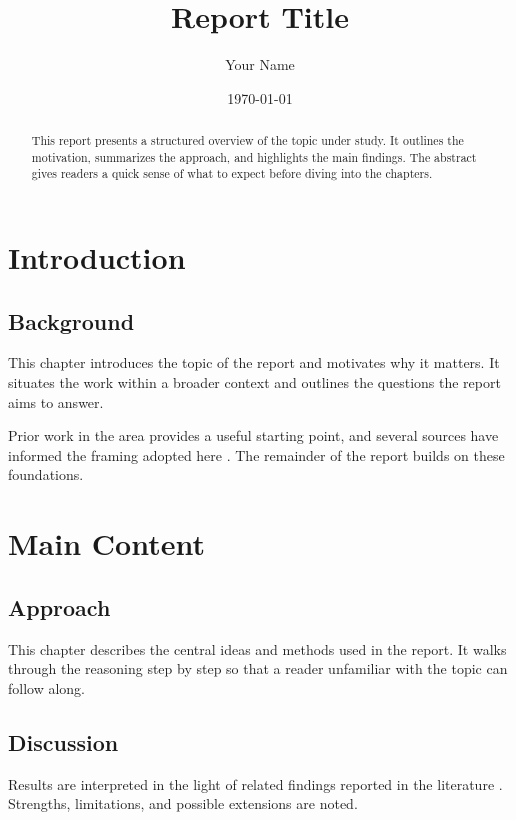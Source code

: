 \documentclass[11pt,a4paper]{report}
\title{Report Title}
\author{Your Name}
\date{\today}
\begin{document}
\maketitle

\begin{abstract}
This report presents a structured overview of the topic under study. It outlines the motivation, summarizes the approach, and highlights the main findings. The abstract gives readers a quick sense of what to expect before diving into the chapters.
\end{abstract}

\tableofcontents
\newpage

\chapter{Introduction}
\section{Background}
This chapter introduces the topic of the report and motivates why it matters. It situates the work within a broader context and outlines the questions the report aims to answer.

Prior work in the area provides a useful starting point, and several sources have informed the framing adopted here \cite{knuth1984}. The remainder of the report builds on these foundations.

\chapter{Main Content}
\section{Approach}
This chapter describes the central ideas and methods used in the report. It walks through the reasoning step by step so that a reader unfamiliar with the topic can follow along.

\section{Discussion}
Results are interpreted in the light of related findings reported in the literature \cite{turing1950}. Strengths, limitations, and possible extensions are noted.
\end{document}
